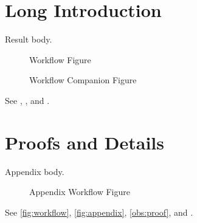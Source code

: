 \section[Short Intro]{Long Introduction}\label{sec:intro}
\begin{oblemma}\label{obs:main}
Result body.
\end{oblemma}
\begin{figure}\caption[Workflow Short]{Workflow Figure}\label{fig:workflow}\end{figure}
\begin{figure}\caption[Workflow Companion]{Workflow Companion Figure}\label{fig:companion}\end{figure}
See , , and .
\appendices
\section[Proof Notes]{Proofs and Details}\label{sec:proof}
\begin{oblemma}\label{obs:proof}
Appendix body.
\end{oblemma}
\begin{figure}\caption[Appendix Workflow Short]{Appendix Workflow Figure}\label{fig:appendix}\end{figure}
See \autoref{fig:workflow}, \autoref{fig:appendix}, \cref{obs:proof}, and .
